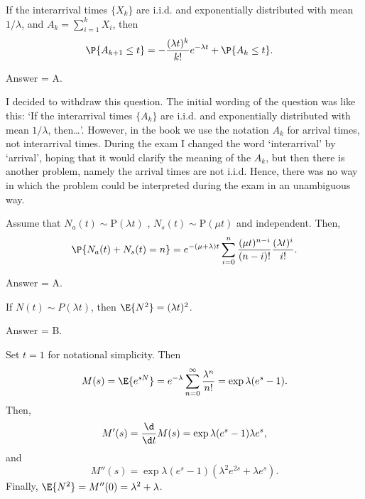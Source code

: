 \begin{exercise}[201703]
 If the interarrival times $\{X_k\}$ are i.i.d. and exponentially
 distributed with mean $1/\lambda$, and $A_k = \sum_{i=1}^k X_i$, then 
\begin{equation*}
 \begin{split}
\P{A_{k+1} \leq t} 
&= - \frac{(\lambda t)^{k}}{k!} e^{-\lambda t} + \P{A_k \leq t}.
 \end{split}
\end{equation*}
\begin{solution}
 Answer = A. 

 I decided to withdraw this question. The initial wording of the
 question was like this: `If the interarrival times $\{A_k\}$ are
 i.i.d. and exponentially distributed with mean $1/\lambda$,
 then\ldots'. However, in the book we use the notation $A_k$ for
 arrival times, not interarrival times. During the exam I changed
 the word `interarrival' by `arrival', hoping that it would clarify
 the meaning of the $A_k$, but then there is another problem,
 namely the arrival times are not i.i.d. Hence, there was no way
 in which the problem could be interpreted during the exam in an
 unambiguous way. 
\end{solution}
\end{exercise}

\begin{exercise}[201703] 
Assume that
 $N_a(t)\sim \text{P}(\lambda t)$ , $N_s(t) \sim \text{P}(\mu t)$ and
 independent. Then,
 \begin{equation*}
\P{N_a(t) + N_s(t) = n} 
= e^{-(\mu+\lambda)t} \sum_{i=0}^n \frac{(\mu t)^{n-i}}{(n-i)!} \frac{(\lambda t)^i}{i!}. \\
 \end{equation*}
\begin{solution}
 Answer = A.
\end{solution}
\end{exercise}


\begin{exercise}[201703]
 If $N(t)\sim P(\lambda t)$,
 then $\E{N^2}=(\lambda t)^2$.

\begin{solution}
Answer = B.

Set $t=1$ for notational simplicity. Then
\begin{equation*}
 M(s) = \E{e^{sN}} = e^{-\lambda}\sum_{n=0}^\infty \frac{\lambda^n}{n!} = \exp{\lambda(e^s-1)}.
\end{equation*}
Then, 
\begin{equation*}
 M'(s) = \frac{\d}{\d t} M(s) = \exp{\lambda(e^s-1)}\lambda e^s,
\end{equation*}
and 
\begin{equation*}
 M''(s) = \exp{\lambda(e^s-1)}(\lambda^2 e^{2s} + \lambda e^s).
\end{equation*}
Finally, 
$\E{N^2} = M''(0) = \lambda^2+\lambda$. 

\end{solution}
\end{exercise}


